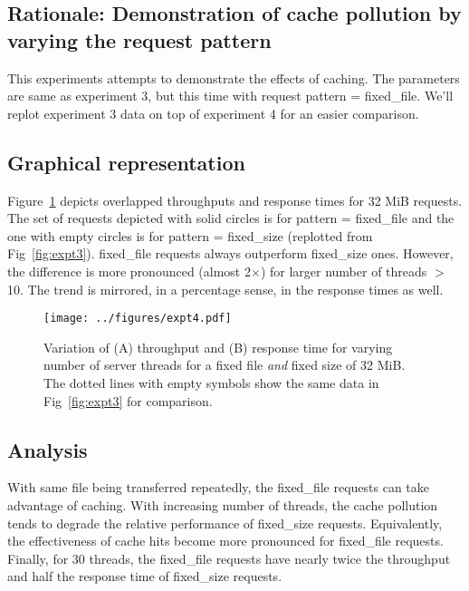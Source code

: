 \documentclass[11pt,letterpaper]{article}
\begin{document}
\subsection{Rationale: Demonstration of cache pollution by varying the request pattern}
This experiments attempts to demonstrate the effects of caching. The parameters are same as experiment 3, but this time with request pattern = {\sc fixed_file}. We'll replot experiment 3 data on top of experiment 4 for an easier comparison.
\subsection{Graphical representation}
Figure~\ref{fig:expt4} depicts overlapped throughputs and response times for 32 MiB requests. The set of requests depicted with solid circles is for pattern = {\sc fixed_file} and the one with empty circles is for pattern = {\sc fixed_size} (replotted from Fig~\ref{fig:expt3}). {\sc fixed_file} requests always outperform {\sc fixed_size} ones. However, the difference is more pronounced (almost 2$\times$) for larger number of threads $>$ 10. The trend is mirrored, in a percentage sense, in the response times as well. 
\begin{figure}[!tbp]
\centering
\texttt{[image: ../figures/expt4.pdf]}
\caption{Variation of (A) throughput and (B) response time for varying number of server threads for a fixed file {\em and} fixed size of 32 MiB. The dotted lines with empty symbols show the same data in Fig~\ref{fig:expt3} for comparison.\label{fig:expt4}}
\end{figure}
\subsection{Analysis}
With same file being transferred repeatedly, the {\sc fixed_file} requests can take advantage of caching. With increasing number of threads, the cache pollution tends to degrade the relative performance of {\sc fixed_size} requests. Equivalently, the effectiveness of cache hits become more pronounced for {\sc fixed_file} requests. Finally, for 30 threads, the {\sc fixed_file} requests have nearly twice the throughput and half the response time of {\sc fixed_size} requests.
\end{document}

